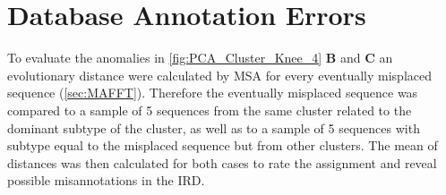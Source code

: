 \section{Database Annotation Errors} \label{sec:Clustering_Anomalies}

To evaluate the anomalies in \autoref{fig:PCA_Cluster_Knee_4} \textbf{\textsf{B}} and \textbf{\textsf{C}}  an evolutionary distance were calculated by \gls{MSA} for every eventually misplaced sequence (\autoref{sec:MAFFT}). Therefore the eventually misplaced sequence was compared to a sample of 5 sequences from the same cluster related to the dominant subtype of the cluster, as well as to a sample of 5 sequences with subtype equal to the misplaced sequence but from other clusters. The mean of distances was then calculated for both cases to rate the assignment and reveal possible misannotations in the \gls{IRD}. 

\begin{table}[!hbt]
    \centering
    \caption[Anomalies in Segment 4 Cluster 2 (\Acrshort{PCA})]{\textbf{Anomalies in Segment 4 Cluster 2 (\Acrshort{PCA}).} The \glspl{MSA} mean distance of the given sequences in comparison to a sample of H1 sequences of the same cluster and a sample of H10 sequences present in other clusters.}
    \label{tab:PCA_Error_4_2}
\end{table}

